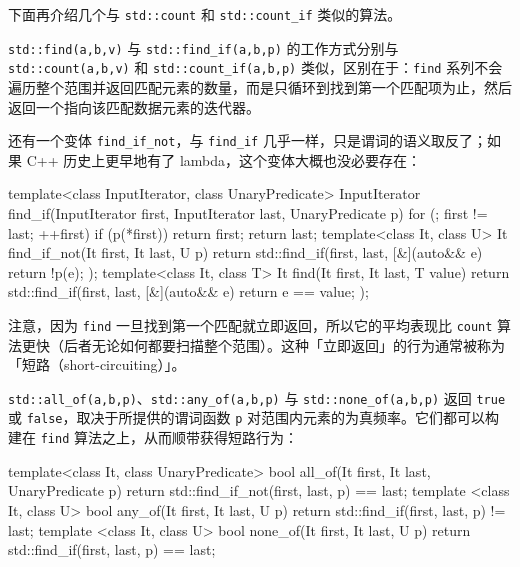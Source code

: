 下面再介绍几个与 \texttt{std::\allowbreak{}count} 和 \texttt{std::\allowbreak{}count\_\allowbreak{}if} 类似的算法。

\texttt{std::\allowbreak{}find(\allowbreak{}a,\allowbreak{}b,\allowbreak{}v)\allowbreak{}} 与 \texttt{std::\allowbreak{}find\_\allowbreak{}if(\allowbreak{}a,\allowbreak{}b,\allowbreak{}p)\allowbreak{}} 的工作方式分别与 \texttt{std::\allowbreak{}count(\allowbreak{}a,\allowbreak{}b,\allowbreak{}v)\allowbreak{}} 和 \texttt{std::\allowbreak{}count\_\allowbreak{}if(\allowbreak{}a,\allowbreak{}b,\allowbreak{}p)\allowbreak{}} 类似，区别在于：\texttt{find} 系列不会遍历整个范围并返回匹配元素的数量，而是只循环到找到第一个匹配项为止，然后返回一个指向该匹配数据元素的迭代器。

还有一个变体 \texttt{find\_\allowbreak{}if\_\allowbreak{}not}，与 \texttt{find\_\allowbreak{}if} 几乎一样，只是谓词的语义取反了；如果 C++ 历史上更早地有了 lambda，这个变体大概也没必要存在：

\begin{codebox}[cpp]
    template<class InputIterator, class UnaryPredicate>
    InputIterator find_if(InputIterator first, InputIterator last,
      UnaryPredicate p)
    {
      for (; first != last; ++first) {
        if (p(*first)) {
          return first;
        }
      }
      return last;
    }
    template<class It, class U>
    It find_if_not(It first, It last, U p) {
      return std::find_if(first, last, [&](auto&& e){ return !p(e); });
    }
    template<class It, class T>
    It find(It first, It last, T value) {
      return std::find_if(first, last, [&](auto&& e)
        { return e == value; });
    }
\end{codebox}

注意，因为 \texttt{find} 一旦找到第一个匹配就立即返回，所以它的平均表现比 \texttt{count} 算法更快（后者无论如何都要扫描整个范围）。这种「立即返回」的行为通常被称为「短路（short-circuiting）」。

\texttt{std::\allowbreak{}all\_\allowbreak{}of(\allowbreak{}a,\allowbreak{}b,\allowbreak{}p)\allowbreak{}}、\texttt{std::\allowbreak{}any\_\allowbreak{}of(\allowbreak{}a,\allowbreak{}b,\allowbreak{}p)\allowbreak{}} 与 \texttt{std::\allowbreak{}none\_\allowbreak{}of(\allowbreak{}a,\allowbreak{}b,\allowbreak{}p)\allowbreak{}} 返回 \texttt{true} 或 \texttt{false}，取决于所提供的谓词函数 \texttt{p} 对范围内元素的为真频率。它们都可以构建在 \texttt{find} 算法之上，从而顺带获得短路行为：

\begin{codebox}[cpp]
    template<class It, class UnaryPredicate>
    bool all_of(It first, It last, UnaryPredicate p)
    {
      return std::find_if_not(first, last, p) == last;
    }
    template <class It, class U>
    bool any_of(It first, It last, U p)
    {
      return std::find_if(first, last, p) != last;
    }
    template <class It, class U>
    bool none_of(It first, It last, U p)
    {
      return std::find_if(first, last, p) == last;
    }
\end{codebox}

